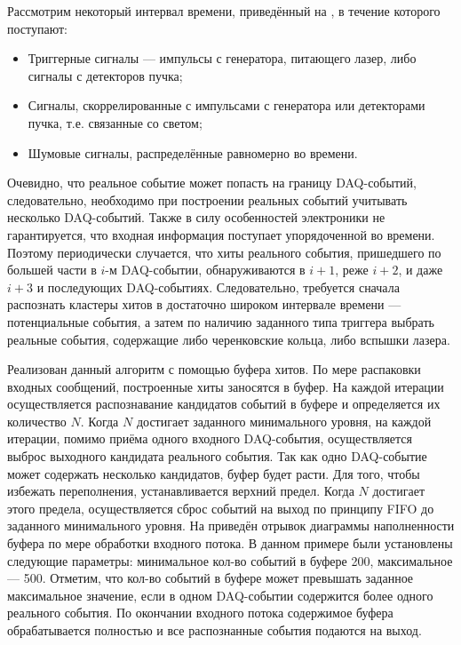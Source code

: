 Рассмотрим некоторый интервал времени, приведённый на , в течение которого поступают:
\begin{itemize}
\item {Триггерные сигналы --- импульсы с генератора, питающего лазер, либо сигналы с детекторов пучка;}
\item {Сигналы, скоррелированные с импульсами с генератора или детекторами пучка, т.е. связанные со светом;}
\item {Шумовые сигналы, распределённые равномерно во времени.}
\end{itemize}

Очевидно, что реальное событие может попасть на границу DAQ-событий, следовательно, необходимо при построении реальных событий учитывать несколько DAQ-событий. Также в силу особенностей электроники не гарантируется, что входная информация поступает упорядоченной во времени. Поэтому периодически случается, что хиты реального события, пришедшего по большей части в $i$-м DAQ-событии, обнаруживаются в $i+1$, реже $i+2$, и даже $i+3$ и последующих DAQ-событиях. Следовательно, требуется сначала распознать кластеры хитов в достаточно широком интервале времени --- потенциальные события, а затем по наличию заданного типа триггера выбрать реальные события, содержащие либо черенковские кольца, либо вспышки лазера.

Реализован данный алгоритм с помощью буфера хитов. По мере распаковки входных сообщений, построенные хиты заносятся в буфер. На каждой итерации осуществляется распознавание кандидатов событий в буфере и определяется их количество $N$. Когда $N$ достигает заданного минимального уровня, на каждой итерации, помимо приёма одного входного DAQ-события, осуществляется выброс выходного кандидата реального события. Так как одно DAQ-событие может содержать несколько кандидатов, буфер будет расти. Для того, чтобы избежать переполнения, устанавливается верхний предел. Когда $N$ достигает этого предела, осуществляется сброс событий на выход по принципу FIFO до заданного минимального уровня. На  приведён отрывок диаграммы наполненности буфера по мере обработки входного потока. В данном примере были установлены следующие параметры: минимальное кол-во событий в буфере 200, максимальное --- 500. Отметим, что кол-во событий в буфере может превышать заданное максимальное значение, если в одном DAQ-событии содержится более одного реального события. По окончании входного потока содержимое буфера обрабатывается полностью и все распознанные события подаются на выход.

